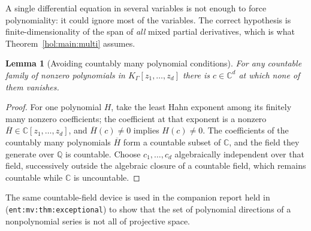 \documentclass[11pt]{article}
\numberwithin{equation}{section}
\newtheorem{lemma}[theorem]{Lemma}
\theoremstyle{definition}
\theoremstyle{remark}
\newcommand{\C}{\mathbb C}
\newcommand{\Q}{\mathbb Q}
\newcommand{\K}{K_\Gamma}
\begin{document}
A single differential equation in several variables is not enough to force
polynomiality: it could ignore most of the variables. The correct hypothesis
is finite-dimensionality of the span of \emph{all} mixed partial derivatives,
which is what Theorem~\ref{hol:main:multi} assumes.

\begin{lemma}[Avoiding countably many polynomial conditions]
\label{hol:lem:generic}
For any countable family of nonzero polynomials in $\K[z_1,\ldots,z_d]$ there
is $c\in\C^d$ at which none of them vanishes.
\end{lemma}

\begin{proof}
For one polynomial $H$, take the least Hahn exponent among its finitely many
nonzero coefficients; the coefficient at that exponent is a nonzero
$\overline H\in\C[z_1,\ldots,z_d]$, and $\overline H(c)\ne0$ implies
$H(c)\ne0$. The coefficients of the countably many polynomials $\overline H$
form a countable subset of $\C$, and the field they generate over $\Q$ is
countable. Choose $c_1,\ldots,c_d$ algebraically independent over that field,
successively outside the algebraic closure of a countable field, which remains
countable while $\C$ is uncountable.
\end{proof}

The same countable-field device is used in the companion report held in
(\texttt{ent:mv:thm:exceptional}) to show that the set of polynomial
directions of a nonpolynomial series is not all of projective space.
\end{document}
